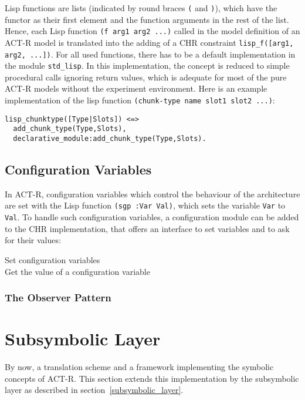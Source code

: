 Lisp functions are lists (indicated by round braces \lstinline|(| and \lstinline|)|), which have the functor as their first element and the function arguments in the rest of the list. Hence, each Lisp function \lstinline|(f arg1 arg2 ...)| called in the model definition of an ACT-R model is translated into the adding of a CHR constraint \lstinline|lisp_f([arg1, arg2, ...])|. For all used functions, there has to be a default implementation in the module \lstinline|std_lisp|. In this implementation, the concept is reduced to simple procedural calls ignoring return values, which is adequate for most of the pure ACT-R models without the experiment environment. Here is an example implementation of the lisp function \lstinline|(chunk-type name slot1 slot2 ...)|:

\begin{lstlisting}
lisp_chunktype([Type|Slots]) <=>
  add_chunk_type(Type,Slots),
  declarative_module:add_chunk_type(Type,Slots).
\end{lstlisting}

\subsection{Configuration Variables}
\label{configuration}

In ACT-R, configuration variables which control the behaviour of the architecture are set with the Lisp function \lstinline|(sgp :Var Val)|, which sets the variable \lstinline|Var| to \lstinline|Val|. To handle such configuration variables, a configuration module can be added to the CHR implementation, that offers an interface to set variables and to ask for their values:

\begin{description}
 \item[Set configuration variables]
 \item[Get the value of a configuration variable]
\end{description}

\subsubsection{The Observer Pattern}



\section{Subsymbolic Layer}

By now, a translation scheme and a framework implementing the symbolic concepts of ACT-R. This section extends this implementation by the subsymbolic layer as described in section~\ref{subsymbolic_layer}.

